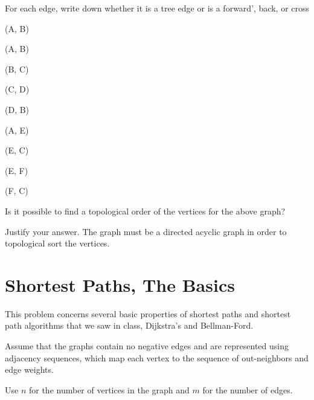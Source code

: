 \begin{problem}[9.]

For each edge, write down whether it is a tree edge or is a
forward', back, or cross

\ask
(A, B)
\sols {}

\ask
(A, B) 
\sols {}

\ask (B, C)
\sols {}

\ask (C, D)
\sols {}

\ask (D, B)
\sols {}

\ask (A, E) 
\sols {}

\ask (E, C) 
\sols {}

\ask (E, F)
\sols {}

\ask (F, C) 
\sols {}
\end{problem}


\begin{problem}[4]

\asktf Is it possible to find a topological order of the vertices
for the above graph?

\solf


\ask 
Justify your answer.
\sol
The graph must be a directed acyclic graph in order to
topological sort the vertices.

\end{problem}



\section{Shortest Paths, The Basics}

This problem concerns several basic properties of shortest paths and
shortest path algorithms that we saw in class, Dijkstra's and
Bellman-Ford.

\begin{assumption}
Assume that the graphs contain no negative edges and are
represented using adjacency sequences,  which map each
vertex to the sequence of out-neighbors and edge weights.

Use $n$ for the number of vertices in the graph and $m$ for the number
of edges.
\end{assumption}



